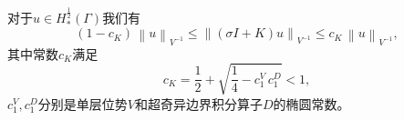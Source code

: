 \begin{theorem}[双层位势的收缩属性]
  \label{theorem:bvp-bie-double-contraction}
  对于$u \in H_{*}^{\frac{1}{2}}(\Gamma)$我们有
  \begin{equation}
    \label{eq:bvp-bie-double-contraction}
    \left( 1 - c_{K} \right) \, \left\| u \right\|_{V^{-1}}
    \le
    \left\| \left( \sigma I + K \right) u \right\|_{V^{-1}}
    \le c_{K} \, \left\| u \right\|_{V^{-1}},
  \end{equation}
  其中常数$c_{K}$满足
  \begin{equation}
    \label{eq:bvp-bie-double-contraction-ckconstant}
    c_{K} = \frac{1}{2} + \sqrt{
    \frac{1}{4} - c_{1}^{V} \, c_{1}^{D}
    } < 1,
  \end{equation}
  $c_{1}^{V},c_{1}^{D}$分别是单层位势$V$和超奇异边界积分算子$D$的椭圆常数。
\end{theorem}
